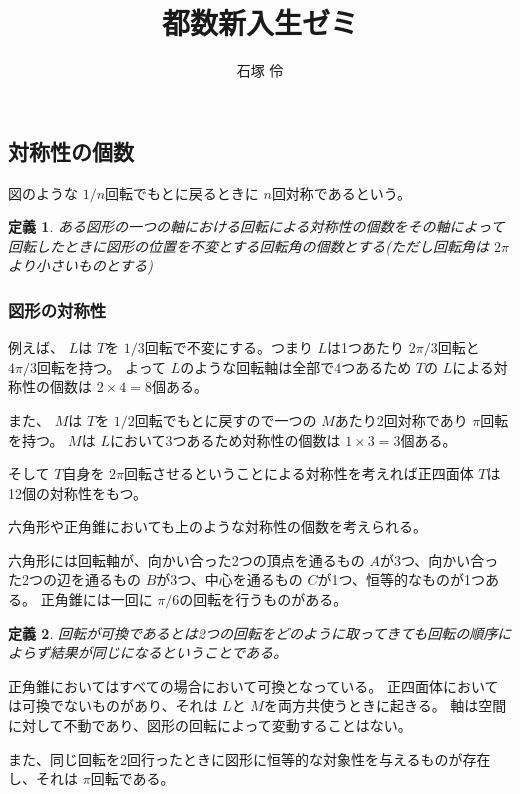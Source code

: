 \documentclass[dvipdfmx]{jsarticle}
\title{都数新入生ゼミ}
\author{石塚 伶}
\date{}
\newtheorem{defi}{定義}
\begin{document}
\maketitle

\subsection{対称性の個数}

図のような $1/n$回転でもとに戻るときに $n$回対称であるという。

\begin{defi}
ある図形の一つの軸における回転による対称性の個数をその軸によって回転したときに図形の位置を不変とする回転角の個数とする(ただし回転角は $2\pi$より小さいものとする)
\end{defi}

\subsubsection{図形の対称性}

例えば、 $L$は $T$を $1/3$回転で不変にする。つまり $L$は1つあたり $2\pi /3$回転と $4\pi /3$回転を持つ。
よって $L$のような回転軸は全部で4つあるため $T$の $L$による対称性の個数は $2 \times 4 = 8$個ある。

また、 $M$は $T$を $1/2$回転でもとに戻すので一つの $M$あたり2回対称であり $\pi$回転を持つ。 $M$は $L$において3つあるため対称性の個数は $1 \times 3 = 3$個ある。

そして $T$自身を $2\pi$回転させるということによる対称性を考えれば正四面体 $T$は12個の対称性をもつ。


六角形や正角錐においても上のような対称性の個数を考えられる。

六角形には回転軸が、向かい合った2つの頂点を通るもの $A$が3つ、向かい合った2つの辺を通るもの $B$が3つ、中心を通るもの $C$が1つ、恒等的なものが1つある。
正角錐には一回に $\pi /6$の回転を行うものがある。

\begin{defi}
回転が可換であるとは2つの回転をどのように取ってきても回転の順序によらず結果が同じになるということである。
\end{defi}

正角錐においてはすべての場合において可換となっている。
正四面体においては可換でないものがあり、それは $L$と $M$を両方共使うときに起きる。
軸は空間に対して不動であり、図形の回転によって変動することはない。

また、同じ回転を2回行ったときに図形に恒等的な対象性を与えるものが存在し、それは $\pi$回転である。
\end{document}
